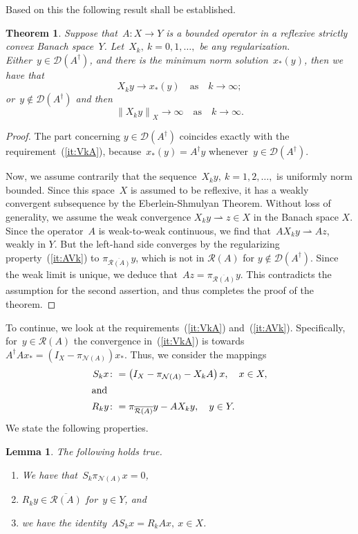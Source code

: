 \documentclass[12pt]{amsart}
\newcommand{\norm}[2]{\left\|#1\right\|_{#2}}
\newcommand{\lr}[1]{\left(#1\right)}
\newcommand{\domain}{\mathcal D}
\newcommand{\range}{\mathcal R}
\newcommand{\N}{\mathcal N}
\newcommand{\Ad}{A^\dag}
\newcommand{\xast}{x_\ast}
\newtheorem{theorem}{Theorem}
\newtheorem{lemma}{Lemma}
\theoremstyle{remark}
\begin{document}
Based on this the following result shall be established.
\begin{theorem}\label{thm:dichotomy}
  Suppose that~$A\colon X\to Y$ is a bounded operator
  in a reflexive strictly convex Banach space~$Y$. Let~$X_{k},\
  k=0,1,\dots,$ be any regularization. \\
  Either~$y\in\domain(\Ad)$, and there is the
  minimum norm solution~$\xast(y)$,
  then we have that
  $$
  X_{k}y  \longrightarrow \xast(y) \quad \mbox{as} \quad k \to \infty;
  $$
  or~$y\not\in\domain(\Ad)$ and then
  $$\norm{X_{k} y}{X}\to\infty \quad \mbox{as} \quad k \to \infty.$$
\end{theorem}
\begin{proof}
  The part concerning $y\in\domain(\Ad)$ coincides exactly with the
  requirement~(\ref{it:VkA}), because~$\xast(y) = \Ad y$ whenever~$y\in\domain(\Ad)$.
\par
Now, we assume contrarily that the sequence~$X_{k}y,\ k=1,2,\dots,$ is uniformly norm bounded. Since this space~$X$ is assumed to be reflexive, it has a weakly convergent
subsequence by the Eberlein-Shmulyan Theorem. Without loss of generality, we assume the weak convergence $X_{k}y \rightharpoonup z\in
X$ in the Banach space $X$. Since the operator~$A$ is weak-to-weak continuous, we find that~$A
X_{k}y \rightharpoonup Az$, weakly in $Y$. But the left-hand side converges by the regularizing property~(\ref{it:AVk}) to $\pi_{\overline{\range(A)}}y$, which is not in $\range(A)$ for $y\not\in\domain(\Ad)$. Since the weak limit is
unique, we deduce that~$Az=\pi_{\overline{\range(A)}}y$. This contradicts
the assumption for the second assertion, and thus completes the proof of the theorem.
\end{proof}
To continue, we look at the requirements~(\ref{it:VkA})
and~(\ref{it:AVk}).
Specifically, for~$y\in \range(A)$ the convergence in~(\ref{it:VkA})
is towards~$\Ad A \xast = \lr{I_{X} - \pi_{\N(A)}}\xast$.
Thus, we consider the mappings
\begin{align}
S_{k}x&\colon = \lr{I_{X} - \pi_{\N(A)} -
          X_{k}A}x,\quad x\in X,\\
  \intertext{and}
  R_{k}y&\colon =
\pi_{\overline{\range(A)}}y - A X_{k}y,\quad y\in Y.
\end{align}
We state the following properties.
\begin{lemma}\label{lem:SkRk}
The following holds true.
\begin{enumerate}
    \item\label{it:spi} We have that~$S_k \pi_{\N(A)} x =0$,
    \item\label{it:Rkrange} $R_ky \in\overline{\range(A)}$ for~$y\in Y$, and
    \item\label{it:ASSR} we have the identity~$A S_k x = R_k A x,\ x\in X$.
\end{enumerate}
\end{lemma}
\end{document}
